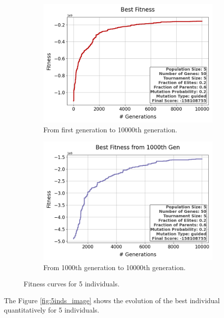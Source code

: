 \documentclass{assignment}
\begin{document}
\begin{figure}[H]
    \begin{subfigure}{0.5\textwidth}
        \includegraphics[width=\textwidth]{figures/best_fitness_output_5_50_5_0.2_0.6_0.2_guided.png}
        \caption{From first generation to 10000th generation.}
    \end{subfigure}\hfill
    \begin{subfigure}{0.5\textwidth}
        \includegraphics[width=\textwidth]{figures/best_fitness_1000_output_5_50_5_0.2_0.6_0.2_guided.png}
        \caption{From 1000th generation to 10000th generation.}
    \end{subfigure}
    \caption{Fitness curves for 5 individuals.}
\label{fig:5inds}
\end{figure}

The Figure \ref{fig:5inds_image} shows the evolution of the best individual quantitatively for 5 individuals.
\end{document}
